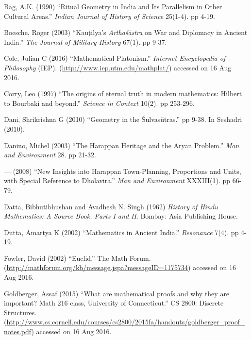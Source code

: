 \begin{thebibliography}{99}
\itemsep=2pt
Bag, A.K. (1990) ``Ritual Geometry in India and Its Parallelism in Other Cultural Areas.'' {\sl Indian Journal of History of Science} 25(1-4). pp 4-19.


Boesche, Roger (2003) ``Kauṭilya's {\sl Arthaśāstra} on War and Diplomacy in Ancient India.'' {\sl The Journal of Military History} 67(1). pp 9-37.

Cole, Julian C (2016) ``Mathematical Platonism.'' {\sl Internet Encyclopedia of Philosophy} (IEP). (\url{http://www.iep.utm.edu/mathplat/})\break 
accessed on 16 Aug 2016.

Corry, Leo (1997) ``The origins of eternal truth in modern mathematics: Hilbert to Bourbaki and beyond.'' {\sl Science in Context} 10(2). pp 253-296.

Dani, Shrikrishna G (2010) ``Geometry in the Śulvasūtras.'' pp 9-38. In Seshadri (2010).

Danino, Michel (2003) ``The Harappan Heritage and the Aryan Problem.'' {\sl Man and Environment} 28. pp 21-32.

--- (2008) ``New Insights into Harappan Town-Planning, Proportions and Units, with Special Reference to Dholavira.'' {\sl Man and Environment} XXXIII(1). pp 66-79.

Datta, Bibhutibhushan and Avadhesh N. Singh (1962) {\sl History of Hindu Mathematics: A Source Book. Parts I and II}. Bombay: Asia Publishing House.

Dutta, Amartya K (2002) ``Mathematics in Ancient India.'' {\sl Resonance} 7(4). pp 4-19.

Fowler, David (2002) ``Euclid.'' The Math Forum. (\url{http://mathforum.org/kb/message.jspa?messageID=1175734}) accessed on 16 Aug 2016.

Goldberger, Assaf (2015) ``What are mathematical proofs and why they are important? Math 216 class, University of Connecticut.'' CS 2800: Discrete Structures. (\url{http://www.cs.cornell.edu/courses/cs2800/2015fa/handouts/goldberger_proof_notes.pdf}) accessed on 16 Aug 2016.


\end{thebibliography}
